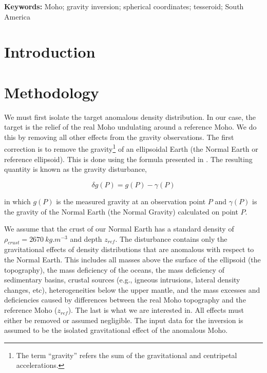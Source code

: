 \documentclass[extra,mreferee]{gji}
\title[]{\Title}
\author[]{
    Leonardo Uieda$^{1,2}$,
    Valéria C. F. Barbosa$^{2}$
    \\
    $^1$Universidade do Estado do Rio de Janeiro, Rio de Janeiro, Brazil.
    e-mail: leo@leouieda.com
    \\
    $^2$Observatório Nacional, Rio de Janeiro, Brazil.
}
\newcommand{\Keywords}{
        Moho;
        gravity inversion;
        spherical coordinates;
        tesseroid;
        South America
}
\begin{document}
\maketitle

\noindent \textbf{Keywords:} \Keywords

\begin{abstract}
\end{abstract}

\section{Introduction}


\section{Methodology}

We must first isolate the target anomalous density distribution.
In our case, the target is the relief of the real Moho undulating around a
reference Moho.
We do this by removing all other effects from the gravity observations.
The first correction is to remove the gravity\footnote{The term ``gravity''
refers the sum of the gravitational and centripetal accelerations.}
of an ellipsoidal Earth (the Normal Earth or reference ellipsoid).
This is done using the formula presented in \citet{li_ellipsoid_2001}.
The resulting quantity is known as the gravity disturbance,

\begin{equation}
    \delta g(P) = g(P) - \gamma(P)
\end{equation}

\noindent in which $g(P)$ is the measured gravity at an observation point $P$
and $\gamma(P)$ is the gravity of the Normal Earth (the Normal Gravity)
calculated on point $P$.

We assume that the crust of our Normal Earth has a standard density of
$\rho_{crust} = 2670\ kg.m^{-3}$ and depth $z_{ref}$.
The disturbance contains only the gravitational effects of density
distributions that are anomalous with respect to the Normal Earth.
This includes all masses above the surface of the ellipsoid (the topography),
the mass deficiency of the oceans,
the mass deficiency of sedimentary basins,
crustal sources (e.g., igneous intrusions, lateral density changes, etc),
heterogeneities below the upper mantle,
and
the mass excesses and deficiencies caused by differences between the real Moho
topography and the reference Moho ($z_{ref}$).
The last is what we are interested in.
All effects must either be removed or assumed negligible.
The input data for the inversion is assumed to be the isolated gravitational
effect of the anomalous Moho.
\end{document}
